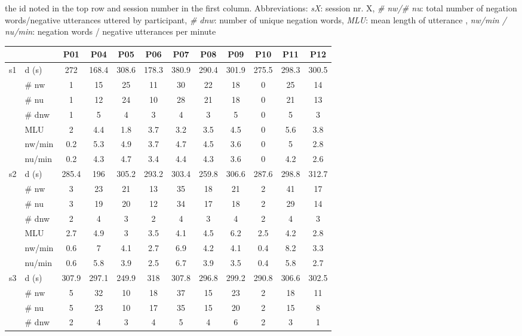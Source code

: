 \begin{screenonly}
\begin{table*}[h]
{    the id noted in the top row and session number in the first column. Abbreviations: \textsl{sX}: session nr. X, \textsl{\# nw/\# nu}: total
    number of negation words/negative utterances uttered by participant, \textsl{\# dnw}: number of unique negation words, \textsl{MLU}: mean
    length of utterance , \textsl{nw/min / nu/min}: negation words / negative utterances per minute}
  \begin{tabular*}{\hsize}{@{\extracolsep{\fill}}clcccccccccc}
    \toprule
    & & P01 & P04 & P05 & P06 & P07 & P08 & P09 & P10 & P11 & P12\\
    \midrule
    \multirow{7}{*}{s1} & d (s) & 272 & 168.4 & 308.6 & 178.3 & 380.9 & 290.4 & 301.9 & 275.5 & 298.3 & 300.5\\
    & \# nw & 1 & 15 & 25 & 11 & 30 & 22 & 18 & 0 & 25 & 14\\
    & \# nu & 1 & 12 & 24 & 10 & 28 & 21 & 18 & 0 & 21 & 13\\
    & \# dnw & 1 & 5 & 4 & 3 & 4 & 3 & 5 & 0 & 5 & 3\\
    & MLU & 2 & 4.4 & 1.8 & 3.7 & 3.2 & 3.5 & 4.5 & 0 & 5.6 & 3.8\\
    & nw/min & 0.2 & 5.3 & 4.9 & 3.7 & 4.7 & 4.5 & 3.6 & 0 & 5 & 2.8\\
    & nu/min & 0.2 & 4.3 & 4.7 & 3.4 & 4.4 & 4.3 & 3.6 & 0 & 4.2 & 2.6\\
    \cmidrule{2-12}
    \multirow{7}{*}{s2} & d (s) & 285.4 & 196 & 305.2 & 293.2 & 303.4 & 259.8 & 306.6 & 287.6 & 298.8 & 312.7\\
    & \# nw & 3 & 23 & 21 & 13 & 35 & 18 & 21 & 2 & 41 & 17\\
    & \# nu & 3 & 19 & 20 & 12 & 34 & 17 & 18 & 2 & 29 & 14\\
    & \# dnw & 2 & 4 & 3 & 2 & 4 & 3 & 4 & 2 & 4 & 3\\
    & MLU & 2.7 & 4.9 & 3 & 3.5 & 4.1 & 4.5 & 6.2 & 2.5 & 4.2 & 2.8\\
    & nw/min & 0.6 & 7 & 4.1 & 2.7 & 6.9 & 4.2 & 4.1 & 0.4 & 8.2 & 3.3\\
    & nu/min & 0.6 & 5.8 & 3.9 & 2.5 & 6.7 & 3.9 & 3.5 & 0.4 & 5.8 & 2.7\\
    \cmidrule{2-12}
    \multirow{7}{*}{s3} & d (s) & 307.9 & 297.1 & 249.9 & 318 & 307.8 & 296.8 & 299.2 & 290.8 & 306.6 & 302.5\\
    & \# nw & 5 & 32 & 10 & 18 & 37 & 15 & 23 & 2 & 18 & 11\\
    & \# nu & 5 & 23 & 10 & 17 & 35 & 15 & 20 & 2 & 15 & 8\\
    & \# dnw & 2 & 4 & 3 & 4 & 5 & 4 & 6 & 2 & 3 & 1\\

\end{tabular*}
\end{table*}
\end{screenonly}
